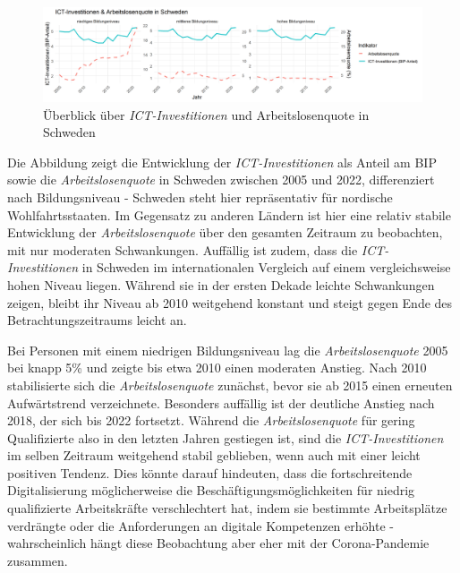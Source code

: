 \begin{figure}[htbp]
    \centering
    \includegraphics[width=\textwidth]{assets/plot_sweden_final.png}
    \caption{Überblick über \textit{\ac{ICT}-Investitionen} und Arbeitslosenquote in 
    Schweden}
    \label{fig:sweden}
\end{figure}

Die Abbildung zeigt die Entwicklung der \textit{\ac{ICT}-Investitionen} als Anteil 
am BIP sowie die \textit{Arbeitslosenquote} in Schweden zwischen 2005 und 2022, 
differenziert nach Bildungsniveau - Schweden steht hier repräsentativ für nordische 
Wohlfahrtsstaaten. Im Gegensatz zu anderen Ländern ist hier eine relativ stabile 
Entwicklung der \textit{Arbeitslosenquote} über den gesamten Zeitraum zu beobachten, mit 
nur moderaten Schwankungen. Auffällig ist zudem, dass die \textit{\ac{ICT}-Investitionen} 
in Schweden im internationalen Vergleich auf einem vergleichsweise hohen Niveau liegen. 
Während sie in der ersten Dekade leichte Schwankungen zeigen, bleibt ihr Niveau ab 
2010 weitgehend konstant und steigt gegen Ende des Betrachtungszeitraums leicht an.

Bei Personen mit einem niedrigen Bildungsniveau lag die \textit{Arbeitslosenquote} 2005 
bei knapp 5\% und zeigte bis etwa 2010 einen moderaten Anstieg. Nach 2010 stabilisierte 
sich die \textit{Arbeitslosenquote} zunächst, bevor sie ab 2015 einen erneuten 
Aufwärtstrend verzeichnete. Besonders auffällig ist der deutliche Anstieg nach 2018, der 
sich bis 2022 fortsetzt. Während die \textit{Arbeitslosenquote} für gering Qualifizierte 
also in den letzten Jahren gestiegen ist, sind die \textit{\ac{ICT}-Investitionen} im 
selben Zeitraum weitgehend stabil geblieben, wenn auch mit einer leicht positiven Tendenz. 
Dies könnte darauf hindeuten, dass die fortschreitende Digitalisierung möglicherweise die 
Beschäftigungsmöglichkeiten für niedrig qualifizierte Arbeitskräfte verschlechtert hat, 
indem sie bestimmte Arbeitsplätze verdrängte oder die Anforderungen an digitale 
Kompetenzen erhöhte - wahrscheinlich hängt diese Beobachtung aber eher mit der 
Corona-Pandemie zusammen.

